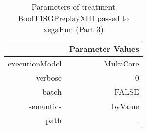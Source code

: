 \begin{table}[ht]
\centering
\begin{tabular}{rr}
  \hline
 & Parameter Values \\ 
  \hline
executionModel & MultiCore \\ 
  verbose & 0 \\ 
  batch & FALSE \\ 
  semantics & byValue \\ 
  path & . \\ 
   \hline
\end{tabular}
\caption{ Parameters of treatment BoolT1SGPreplayXIII passed to xegaRun
 (Part 3)} 
\end{table}
